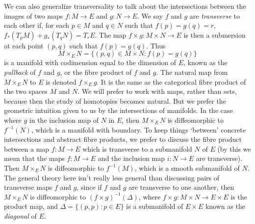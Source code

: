 \begin{comment}
In many respects, we should expect `generic' submanifolds to intersect transversally.

\begin{example}
    Two subspaces $V,W \subset \RR^d$ intersect transversally precisely when $V + W = \RR^d$. Fix $n,m < d$ with $n + m \geq d$, and consider
    \[ \Sigma = \{ (V,W) \in G(n,d) \times G(m,d) : V + W \neq \RR^d \}. \]
    If we identify $G(n,d) \times G(m,d)$ with a quotient of
    \[ \{ (v,w) \in (\RR^d)^n \times (\RR^d)^m : (v_1, \dots, v_n)\ \text{and}\ (w_1, \dots, w_m)\ \text{are linearly independent} \}, \]
    We can write $\Sigma$ as the set of all $[v,w]$ such that for each $i_1, \dots, i_\alpha \in \{ 1, \dots, n \}$ and $j_1, \dots, j_{d-\alpha} \in \{ 1, \dots, m \}$,
    \[ v_{i_1} \wedge \dots \wedge v_{i_\alpha} \wedge w_{j_1} \wedge \dots \wedge w_{j_{d-\alpha}} = 0. \]
    Thus $\Sigma$ is a proper projective subvariety of $GL(n) \times GL(m)$, which means that for a `algebraically generic' pair $(V,W) \in GL(n,d) \times GL(m,d)$, $V + W = \RR^d$.
\end{example}
\end{comment}

We can also generalize transversality to talk about the intersections between the images of two maps $f: M \to E$ and $g: N \to E$. We say $f$ and $g$ are \emph{transverse} to each other if, for each $p \in M$ and $q \in N$ such that $f(p) = g(q) = r$, $f_*(T_p M) + g_*(T_q N) = T_r E$. The map $f \times g : M \times N \to E$ is then a submersion at each point $(p,q)$ such that $f(p) = g(q)$. Thus
%
\[ M \times_E N = \{ (p,q) \in M \times N : f(p) = g(q) \} \]
%
is a manifold with codimension equal to the dimension of $E$, known as the \emph{pullback} of $f$ and $g$, or the fibre product of $f$ and $g$. The natural map from $M \times_E N$ to $E$ is denoted $f \times_E g$. It is the same as the categorical fibre product of the two spaces $M$ and $N$. We will prefer to work with maps, rather than sets, because then the study of homotopies becomes natural. But we prefer the geometric intuition given to us by the intersections of manifolds. In the case where $g$ in the inclusion map of $N$ in $E$, then $M \times_E N$ is diffeomorphic to $f^{-1}(N)$, which is a manifold with boundary. To keep things `between' concrete intersections and abstract fibre products, we prefer to discuss the fibre product between a map $f: M \to E$ which is transverse to a submanifold $N$ of $E$ (by this we mean that the maps $f: M \to E$ and the inclusion map $i: N \to E$ are transverse). Then $M \times_E N$ is diffeomorphic to $f^{-1}(M)$, which is a smooth submanifold of $N$. The general theory here isn't really less general than discussing pairs of transverse maps $f$ and $g$, since if $f$ and $g$ are transverse to one another, then $M \times_E N$ is diffeomorphic to $(f \times g)^{-1}(\Delta)$, where $f \times g: M \times N \to E \times E$ is the product map, and $\Delta = \{ (p,p): p \in E \}$ is a submanifold of $E \times E$ known as the \emph{diagonal} of $E$.

